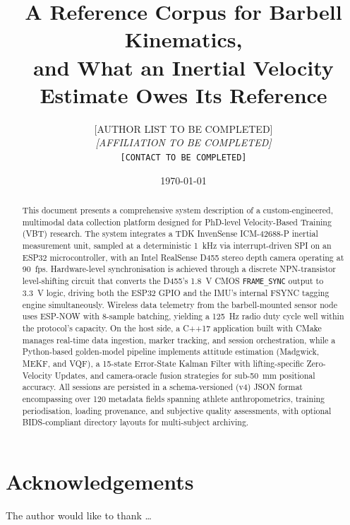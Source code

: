 \documentclass[11pt,onecolumn,letterpaper]{article}
\title{
  \textbf{A Reference Corpus for Barbell Kinematics,\\
  and What an Inertial Velocity Estimate Owes Its Reference}
}
\author{
  [AUTHOR LIST TO BE COMPLETED] \\
  \textit{[AFFILIATION TO BE COMPLETED]} \\
  \texttt{[CONTACT TO BE COMPLETED]}
}
\date{\today}
\begin{document}
\maketitle

\begin{abstract}
This document presents a comprehensive system description of a custom-engineered, multimodal data collection platform designed for PhD-level Velocity-Based Training (VBT) research.
The system integrates a TDK InvenSense ICM-42688-P inertial measurement unit, sampled at a deterministic \SI{1}{\kilo\hertz} via interrupt-driven SPI on an ESP32 microcontroller, with an Intel RealSense D455 stereo depth camera operating at \SI{90}{fps}.
Hardware-level synchronisation is achieved through a discrete NPN-transistor level-shifting circuit that converts the D455's \SI{1.8}{\volt} CMOS \texttt{FRAME\_SYNC} output to \SI{3.3}{\volt} logic, driving both the ESP32 GPIO and the IMU's internal FSYNC tagging engine simultaneously.
Wireless data telemetry from the barbell-mounted sensor node uses ESP-NOW with 8-sample batching, yielding a \SI{125}{\hertz} radio duty cycle well within the protocol's capacity.
On the host side, a C++17 application built with CMake manages real-time data ingestion, marker tracking, and session orchestration, while a Python-based golden-model pipeline implements attitude estimation (Madgwick, MEKF, and VQF), a 15-state Error-State Kalman Filter with lifting-specific Zero-Velocity Updates, and camera-oracle fusion strategies for sub-\SI{50}{\milli\metre} positional accuracy.
All sessions are persisted in a schema-versioned (v4) JSON format encompassing over 120 metadata fields spanning athlete anthropometrics, training periodisation, loading provenance, and subjective quality assessments, with optional BIDS-compliant directory layouts for multi-subject archiving.
\end{abstract}

\tableofcontents
\newpage













\newpage
\section*{Acknowledgements}
The author would like to thank \ldots



\end{document}
